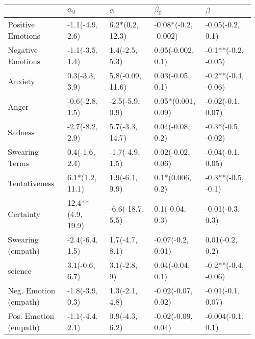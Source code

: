 \begin{tabular}{lllll}
\toprule
{} &         $\alpha_0$ &          $\alpha$ &             $\beta_0$ &              $\beta$ \\
\midrule
Positive Emotions     &    -1.1(-4.9, 2.6) &   6.2*(0.2, 12.3) &  -0.08*(-0.2, -0.002) &     -0.05(-0.2, 0.1) \\
Negative Emotions     &    -1.1(-3.5, 1.4) &    1.4(-2.5, 5.3) &     0.05(-0.002, 0.1) &  -0.1**(-0.2, -0.05) \\
Anxiety               &     0.3(-3.3, 3.9) &  5.8(-0.09, 11.6) &      0.03(-0.05, 0.1) &  -0.2**(-0.4, -0.06) \\
Anger                 &    -0.6(-2.8, 1.5) &   -2.5(-5.9, 0.9) &    0.05*(0.001, 0.09) &    -0.02(-0.1, 0.07) \\
Sadness               &    -2.7(-8.2, 2.9) &   5.7(-3.3, 14.7) &      0.04(-0.08, 0.2) &   -0.3*(-0.5, -0.02) \\
Swearing Terms        &     0.4(-1.6, 2.4) &   -1.7(-4.9, 1.5) &     0.02(-0.02, 0.06) &    -0.04(-0.1, 0.05) \\
Tentativeness         &    6.1*(1.2, 11.1) &    1.9(-6.1, 9.9) &      0.1*(0.006, 0.2) &   -0.3**(-0.5, -0.1) \\
Certainty             &  12.4**(4.9, 19.9) &  -6.6(-18.7, 5.5) &       0.1(-0.04, 0.3) &     -0.01(-0.3, 0.3) \\
Swearing (empath)     &    -2.4(-6.4, 1.5) &    1.7(-4.7, 8.1) &     -0.07(-0.2, 0.01) &      0.01(-0.2, 0.2) \\
science               &     3.1(-0.6, 6.7) &      3.1(-2.8, 9) &      0.04(-0.04, 0.1) &  -0.2**(-0.4, -0.06) \\
Neg. Emotion (empath) &    -1.8(-3.9, 0.3) &    1.3(-2.1, 4.8) &    -0.02(-0.07, 0.02) &    -0.01(-0.1, 0.07) \\
Pos. Emotion (empath) &    -1.1(-4.4, 2.1) &    0.9(-4.3, 6.2) &    -0.02(-0.09, 0.04) &    -0.004(-0.1, 0.1) \\
\bottomrule
\end{tabular}
